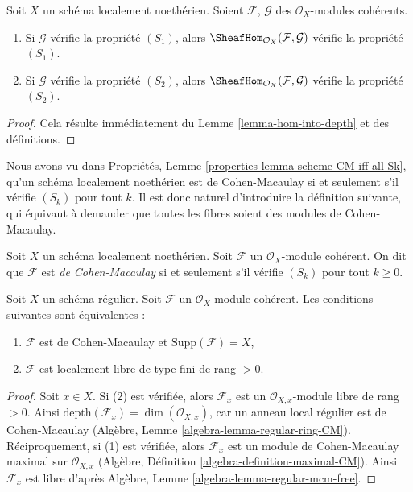 \begin{lemma}
\label{lemma-hom-into-S2}
Soit $X$ un schéma localement noethérien. Soient $\mathcal{F}$, $\mathcal{G}$
des $\mathcal{O}_X$-modules cohérents.
\begin{enumerate}
\item Si $\mathcal{G}$ vérifie la propriété $(S_1)$, alors
$\SheafHom_{\mathcal{O}_X}(\mathcal{F}, \mathcal{G})$ vérifie la propriété $(S_1)$.
\item Si $\mathcal{G}$ vérifie la propriété $(S_2)$, alors
$\SheafHom_{\mathcal{O}_X}(\mathcal{F}, \mathcal{G})$ vérifie la propriété $(S_2)$.
\end{enumerate}
\end{lemma}

\begin{proof}
Cela résulte immédiatement du Lemme \ref{lemma-hom-into-depth}
et des définitions.
\end{proof}

\noindent
Nous avons vu dans Propriétés, Lemme \ref{properties-lemma-scheme-CM-iff-all-Sk},
qu'un schéma localement noethérien
est de Cohen-Macaulay si et seulement s'il vérifie $(S_k)$ pour tout $k$.
Il est donc naturel d'introduire la définition suivante, qui
équivaut à demander que toutes les fibres soient des modules de Cohen-Macaulay.

\begin{definition}
\label{definition-Cohen-Macaulay}
Soit $X$ un schéma localement noethérien.
Soit $\mathcal{F}$ un $\mathcal{O}_X$-module cohérent.
On dit que $\mathcal{F}$ est {\it de Cohen-Macaulay} si et seulement
s'il vérifie $(S_k)$ pour tout $k \geq 0$.
\end{definition}

\begin{lemma}
\label{lemma-Cohen-Macaulay-over-regular}
Soit $X$ un schéma régulier. Soit $\mathcal{F}$ un
$\mathcal{O}_X$-module cohérent. Les conditions suivantes sont équivalentes :
\begin{enumerate}
\item $\mathcal{F}$ est de Cohen-Macaulay et $\text{Supp}(\mathcal{F}) = X$,
\item $\mathcal{F}$ est localement libre de type fini de rang $> 0$.
\end{enumerate}
\end{lemma}

\begin{proof}
Soit $x \in X$. Si (2) est vérifiée, alors $\mathcal{F}_x$ est un
$\mathcal{O}_{X, x}$-module libre de rang $> 0$. Ainsi
$\text{depth}(\mathcal{F}_x) = \dim(\mathcal{O}_{X, x})$,
car un anneau local régulier est de Cohen-Macaulay
(Algèbre, Lemme \ref{algebra-lemma-regular-ring-CM}).
Réciproquement, si (1) est vérifiée, alors $\mathcal{F}_x$ est un
module de Cohen-Macaulay maximal sur $\mathcal{O}_{X, x}$
(Algèbre, Définition \ref{algebra-definition-maximal-CM}).
Ainsi $\mathcal{F}_x$ est libre d'après
Algèbre, Lemme \ref{algebra-lemma-regular-mcm-free}.
\end{proof}









